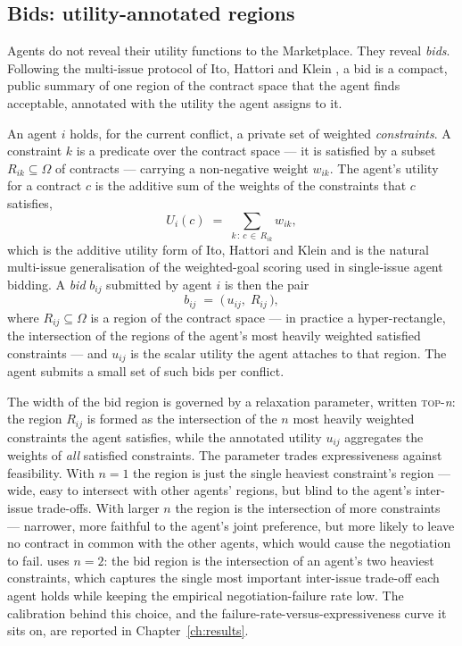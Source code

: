 \subsection{Bids: utility-annotated regions}
\label{subsec:bids}

Agents do not reveal their utility functions to the Marketplace. They
reveal \emph{bids}. Following the multi-issue protocol of Ito, Hattori
and Klein \cite{ito2007multiissue}, a bid is a compact, public summary
of one region of the contract space that the agent finds acceptable,
annotated with the utility the agent assigns to it.

An agent $i$ holds, for the current conflict, a private set of weighted
\emph{constraints}. A constraint $k$ is a predicate over the contract
space --- it is satisfied by a subset $R_{ik} \subseteq \Omega$ of
contracts --- carrying a non-negative weight $w_{ik}$. The agent's
utility for a contract $c$ is the additive sum of the weights of the
constraints that $c$ satisfies,
%
\begin{equation}
  \label{eq:utility}
  U_i(c) \;=\; \sum_{k \,:\, c \,\in\, R_{ik}} w_{ik},
\end{equation}
%
which is the additive utility form of Ito, Hattori and Klein
\cite{ito2007multiissue} and is the natural multi-issue generalisation
of the weighted-goal scoring used in single-issue agent bidding.
A \emph{bid} $b_{ij}$ submitted by agent $i$ is then the pair
%
\begin{equation}
  \label{eq:bid}
  b_{ij} \;=\; \bigl(\, u_{ij},\; R_{ij} \,\bigr),
\end{equation}
%
where $R_{ij} \subseteq \Omega$ is a region of the contract space ---
in practice a hyper-rectangle, the intersection of the regions of the
agent's most heavily weighted satisfied constraints --- and $u_{ij}$ is
the scalar utility the agent attaches to that region. The agent submits
a small set of such bids per conflict.

The width of the bid region is governed by a relaxation parameter,
written \textsc{top}-\textit{n}: the region $R_{ij}$ is formed as the
intersection of the $n$ most heavily weighted constraints the agent
satisfies, while the annotated utility $u_{ij}$ aggregates the weights
of \emph{all} satisfied constraints. The parameter trades expressiveness
against feasibility. With $n=1$ the region is just the single heaviest
constraint's region --- wide, easy to intersect with other agents'
regions, but blind to the agent's inter-issue trade-offs. With larger
$n$ the region is the intersection of more constraints --- narrower,
more faithful to the agent's joint preference, but more likely to leave
no contract in common with the other agents, which would cause the
negotiation to fail. \NEXUS{} uses $n=2$: the bid region is the
intersection of an agent's two heaviest constraints, which captures the
single most important inter-issue trade-off each agent holds while
keeping the empirical negotiation-failure rate low. The calibration
behind this choice, and the failure-rate-versus-expressiveness curve it
sits on, are reported in Chapter~\ref{ch:results}.

